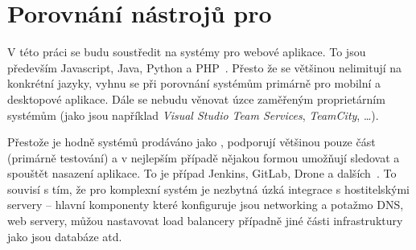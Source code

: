\chapter{Porovnání nástrojů pro \CICD}
    V této práci se budu soustředit na systémy pro webové aplikace. To jsou především Javascript, Java, Python a PHP~\cite{github-octoverse-languages}. Přesto že se \CI většinou nelimitují na konkrétní jazyky, vyhnu se při porovnání systémům primárně pro mobilní a desktopové aplikace. Dále se nebudu věnovat úzce zaměřeným proprietárním systémům (jako jsou například \textit{Visual Studio Team Services}, \textit{TeamCity}, \ldots).


    Přestože je hodně systémů prodáváno jako \CICD, podporují většinou pouze \CI část (primárně testování) a v nejlepším případě nějakou formou umožňují sledovat a spouštět nasazení aplikace. To je případ Jenkins, GitLab, Drone a dalších~\cite{ellingwood-cicd-list}. To souvisí s tím, že pro komplexní \CD systém je nezbytná úzká integrace s hostitelskými servery -- hlavní komponenty které \CD konfiguruje jsou networking a potažmo DNS, \HTTP web servery, můžou nastavovat load balancery případně jiné části infrastruktury jako jsou databáze atd.

    

    \newpage
    

    \newpage
    

    \newpage
    

    \newpage
    

    \newpage
    

    \newpage
    

    \newpage
    


    \newpage
    
